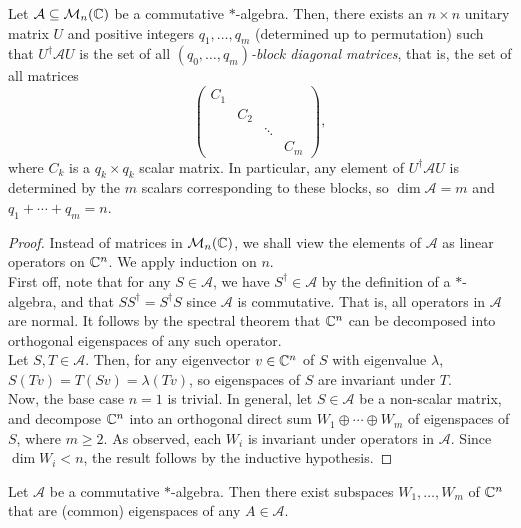 	\begin{ftheo}
		Let $\mathcal{A} \subseteq \mathcal{M}_n(\mathbb{C})$ be a commutative $*$-algebra. Then, there exists an $n \times n$ unitary matrix $U$ and positive integers $q_1,\ldots,q_m$ (determined up to permutation) such that $U^\dagger \mathcal{A} U$ is the set of all \emph{$(q_0,\ldots,q_m)$-block diagonal matrices}, that is, the set of all matrices
		\[ \begin{pmatrix} C_1 & & & \\ & C_2 & & \\ & & \ddots & \\ & & & C_m \end{pmatrix}, \]
		where $C_k$ is a $q_k \times q_k$ scalar matrix. In particular, any element of $U^\dagger \mathcal{A} U$ is determined by the $m$ scalars corresponding to these blocks, so $\dim \mathcal{A} = m$ and $q_1 + \cdots + q_m = n$.
	\end{ftheo}
	\begin{proof}
		Instead of matrices in $\mathcal{M}_n(\mathbb{C})$, we shall view the elements of $\mathcal{A}$ as linear operators on $\mathbb{C}^n$. We apply induction on $n$.\\
		First off, note that for any $S \in \mathcal{A}$, we have $S^\dagger \in \mathcal{A}$ by the definition of a $*$-algebra, and that $SS^\dagger = S^\dagger S$ since $\mathcal{A}$ is commutative. That is, all operators in $\mathcal{A}$ are normal. It follows by the spectral theorem that $\mathbb{C}^n$ can be decomposed into orthogonal eigenspaces of any such operator. \\
		Let $S,T \in \mathcal{A}$. Then, for any eigenvector $v \in \mathbb{C}^n$ of $S$ with eigenvalue $\lambda$, $S(Tv) = T(Sv) = \lambda (Tv)$, so eigenspaces of $S$ are invariant under $T$.\\
		Now, the base case $n=1$ is trivial. In general, let $S \in \mathcal{A}$ be a non-scalar matrix, and decompose $\mathbb{C}^n$ into an orthogonal direct sum $W_1 \oplus \cdots \oplus W_m$ of eigenspaces of $S$, where $m \ge 2$. As observed, each $W_i$ is invariant under operators in $\mathcal{A}$. Since $\dim W_i < n$, the result follows by the inductive hypothesis.
	\end{proof}

	\begin{corollary}
		Let $\mathcal{A}$ be a commutative $*$-algebra. Then there exist subspaces $W_1,\ldots,W_m$ of $\mathbb{C}^n$ that are (common) eigenspaces of any $A \in \mathcal{A}$.
	\end{corollary}

